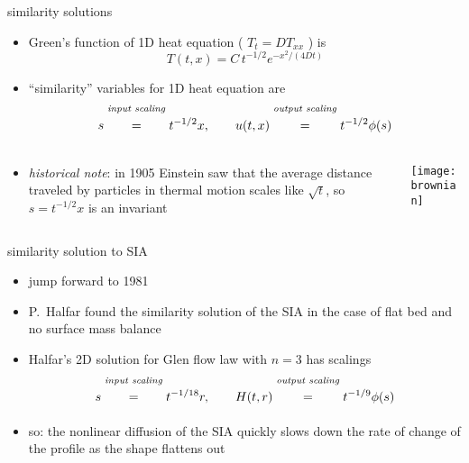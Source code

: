 \begin{frame}{similarity solutions}

\begin{itemize}
\item Green's function of 1D heat equation ( $T_t=D T_{xx}$ ) is
	$$T(t,x) = C\, t^{-1/2} e^{-x^2/(4Dt)}$$
\item ``similarity'' variables for 1D heat equation are
	$$s \stackrel{\text{\emph{input scaling}}}{\phantom{\Big|}=\phantom{\Big|}} t^{-1/2} x, \qquad u(t,x) \stackrel{\text{\emph{output scaling}}}{\phantom{\Big|}=\phantom{\Big|}} t^{-1/2} \phi(s)$$
\end{itemize}
\begin{columns}
\begin{column}{0.6\textwidth}
\begin{itemize}
\item \emph{historical note}:  in 1905 Einstein saw that the average distance traveled by particles in thermal motion scales like $\sqrt{t}$, so $s = t^{-1/2}x$ is an invariant
\end{itemize}
\end{column}
\begin{column}{0.4\textwidth}
\begin{center}
\texttt{[image: brownian]}
\end{center}
\end{column}
\end{columns}

\end{frame}


\begin{frame}{similarity solution to SIA}

\begin{itemize}
\item jump forward to 1981
\item P.~Halfar found the similarity solution of the SIA in the case of flat bed and no surface mass balance
\item Halfar's 2D solution for Glen flow law with $n=3$ has scalings
	$$s \stackrel{\text{\emph{input scaling}}}{\phantom{\Big|}=\phantom{\Big|}} t^{-1/18} r, \qquad H(t,r) \stackrel{\text{\emph{output scaling}}}{\phantom{\Big|}=\phantom{\Big|}} t^{-1/9} \phi(s)$$
\item so: the nonlinear diffusion of the SIA quickly slows down the rate of change of the profile as the shape flattens out
\end{itemize}
\end{frame}


